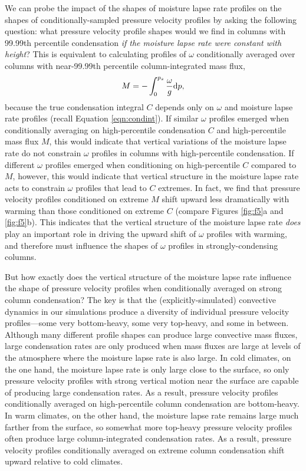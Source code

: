 \documentclass[twocol]{ametsoc}
\begin{document}
We can probe the impact of the shapes of moisture lapse rate profiles on the shapes of conditionally-sampled pressure velocity profiles by asking the following question: what pressure velocity profile shapes would we find in columns with 99.99th percentile condensation {\it if the moisture lapse rate were constant with height}? This is equivalent to calculating profiles of $\omega$ conditionally averaged over columns with near-99.99th percentile column-integrated mass flux,
\begin{equation}
    M = -\int_{0}^{p_s} \frac{\omega}{g} {\rm d}p,
\end{equation}
because the true condensation integral $C$ depends only on $\omega$ and moisture lapse rate profiles (recall Equation \ref{eqn:condint}). If similar $\omega$ profiles emerged when conditionally averaging on high-percentile condensation $C$ and high-percentile mass flux $M$, this would indicate that vertical variations of the moisture lapse rate do not constrain $\omega$ profiles in columns with high-percentile condensation. If different $\omega$ profiles emerged when conditioning on high-percentile $C$ compared to $M$, however, this would indicate that vertical structure in the moisture lapse rate acts to constrain $\omega$ profiles that lead to $C$ extremes. In fact, we find that pressure velocity profiles conditioned on extreme $M$ shift upward less dramatically with warming than those conditioned on extreme $C$ (compare Figures \ref{fig:f5}a and \ref{fig:f5}b). This indicates that the vertical structure of the moisture lapse rate {\it does} play an important role in driving the upward shift of $\omega$ profiles with warming, and therefore must influence the shapes of $\omega$ profiles in strongly-condensing columns.

But how exactly does the vertical structure of the moisture lapse rate influence the shape of pressure velocity profiles when conditionally averaged on strong column condensation? The key is that the (explicitly-simulated) convective dynamics in our simulations produce a diversity of individual pressure velocity profiles---some very bottom-heavy, some very top-heavy, and some in between. Although many different profile shapes can produce large convective mass fluxes, large condensation rates are only produced when mass fluxes are large at levels of the atmosphere where the moisture lapse rate is also large. In cold climates, on the one hand, the moisture lapse rate is only large close to the surface, so only pressure velocity profiles with strong vertical motion near the surface are capable of producing large condensation rates. As a result, pressure velocity profiles conditionally averaged on high-percentile column condensation are bottom-heavy. In warm climates, on the other hand, the moisture lapse rate remains large much farther from the surface, so somewhat more top-heavy pressure velocity profiles often produce large column-integrated condensation rates. As a result, pressure velocity profiles conditionally averaged on extreme column condensation shift upward relative to cold climates.
\end{document}
